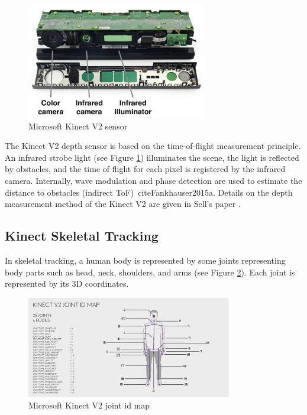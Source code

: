 \begin{figure}[htbp]
  \centering\includegraphics[width=0.7\textwidth]{./img/kinect.png}
  \caption[Microsoft Kinect V2 sensor]{Microsoft Kinect V2 sensor \cite{Fankhauser2015}}\label{fig:kinect}
\end{figure}

\par The Kinect V2 depth sensor is based on the time-of-flight measurement principle. An infrared strobe light (see Figure \ref{fig:kinect}) illuminates the scene, the light is reflected by obstacles, and the time of flight for each pixel is registered by the infrared camera. Internally, wave modulation and phase detection are used to estimate the distance to obstacles (indirect ToF)\ cite{Fankhauser2015a}. Details on the depth measurement method of the Kinect V2 are given in Sell's paper \cite{Sell}.

\subsection*{Kinect Skeletal Tracking}
\par In skeletal tracking, a human body is represented by some joints representing body parts such as head, neck, shoulders, and arms (see Figure \ref{fig:skeletonmap}). Each joint is represented by its 3D coordinates.

\begin{figure}[htbp]
  \centering\includegraphics[width=0.8\textwidth]{./img/kinectskeleton.png}
  \caption[Microsoft Kinect V2 joint id map]{Microsoft Kinect V2 joint id map \footnotemark}\label{fig:skeletonmap}
\end{figure}


